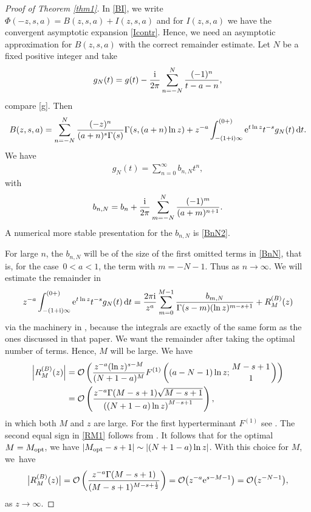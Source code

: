\documentclass[pdftex]{sigma}
\numberwithin{equation}{section}
\newcommand\mytop[2]{\genfrac{}{}{0pt}{}{#1}{#2}}
\def\expe{{\rm e}}
\def\iunit{{\rm i}}
\def\id{\,{\rm d}}
\def\bigO{{\mathcal O}}
\begin{document}
\begin{proof}[Proof of Theorem \ref{thm1}]
In \eqref{BI}, we write $\Phi(-z,s,a)=B(z,s,a)+I(z,s,a)$ and for $I(z,s,a)$
we have the convergent asymptotic expansion \eqref{Icontr}. Hence, we need an asymptotic
approximation for $B(z,s,a)$ with the correct remainder estimate.
Let $N$ be a fixed positive integer and take
\begin{gather*}%
 g_N(t)=g(t)-\frac{\iunit}{2\pi}\sum_{n=-N}^N\frac{(-1)^n}{t-a-n},
\end{gather*}
compare \eqref{g}. Then
\begin{gather*}%
 B(z,s,a)=\sum_{n=-N}^N \frac{(-z)^n}{(a+n)^s\Gamma(s)}\Gamma(s,(a+n)\ln z)
 +z^{-a}\int_{-(1+\iunit)\infty}^{(0+)}\expe^{t\ln z} t^{-s}g_N(t)\id t.
\end{gather*}
We have
\begin{gather*}%
 g_N(t)=\sum_{n=0}^\infty b_{n,N}t^n,
\end{gather*}
with
\begin{gather}\label{BnN}
 b_{n,N}=b_n+\frac{\iunit}{2\pi}\sum_{m=-N}^N \frac{(-1)^m}{(a+m)^{n+1}}.
\end{gather}
A numerical more stable presentation for the $b_{n,N}$ is \eqref{BnN2}.

For large $n$, the $b_{n,N}$ will be of the size of the first omitted terms in \eqref{BnN},
that is, for the case~$0<a<1$, the term with $m=-N-1$.
Thus
\smash{$b_{n,N}\sim \frac{\iunit}{2\pi}(-1)^N (a-N-1)^{-n-1}$} as $n\to\infty$.
We will estimate the remainder in
\begin{gather*}%
 z^{-a}\int_{-(1+\iunit)\infty}^{(0+)}\expe^{t\ln z} t^{-s}g_N(t)\id t
 =\frac{2\pi\iunit}{z^{a}}\sum_{m=0}^{M-1}
 \frac{b_{m,N}}{\Gamma(s-m)(\ln z)^{m-s+1}}+R_M^{(B)}(z)
\end{gather*}
via the machinery in \cite[Section~4]{OD98}, because the integrals are exactly of the same form
as the ones discussed in that paper.
We want the remainder after taking the optimal number of terms. Hence, $M$ will be large.
We have
\begin{align}
 \left|R_M^{(B)}(z)\right|&=\bigO\left(\frac{z^{-a} (\ln z)^{s-M}}{%
 (N+1-a)^{M}}F^{(1)}\left((a-N-1)\ln z;\mytop{M-s+1}{1}\right)\right)\nonumber\\
 &=\bigO\left(\frac{z^{-a} \Gamma(M-s+1)\sqrt{M-s+1}}{%
 \left((N+1-a)\ln z\right)^{M-s+1}}\right),\label{RM1}
\end{align}
in which both $M$ and $z$ are large. For the first hyperterminant $F^{(1)}$ see
\cite[Appendix A]{BHNOD2018}. The second equal sign in \eqref{RM1} follows from
\cite[Proposition~B.1]{BHNOD2018}.
It follows that for the optimal~${M=M_{\rm opt}}$, we have
$|M_{\rm opt}-s+1|\sim |(N+1-a)\ln z|$. With this choice for $M$, we~have
\begin{gather*}%
 \bigl|R_M^{(B)}(z)\bigr|=\bigO\left(\frac{z^{-a}
 \Gamma(M-s+1)}{(M-s+1)^{M-s+\frac12}}\right)=
 \bigO\bigl(z^{-a}\expe^{s-M-1}\bigr)=\bigO\bigl(z^{-N-1}\bigr),
\end{gather*}
as $z\to\infty$.


\end{proof}
\end{document}
